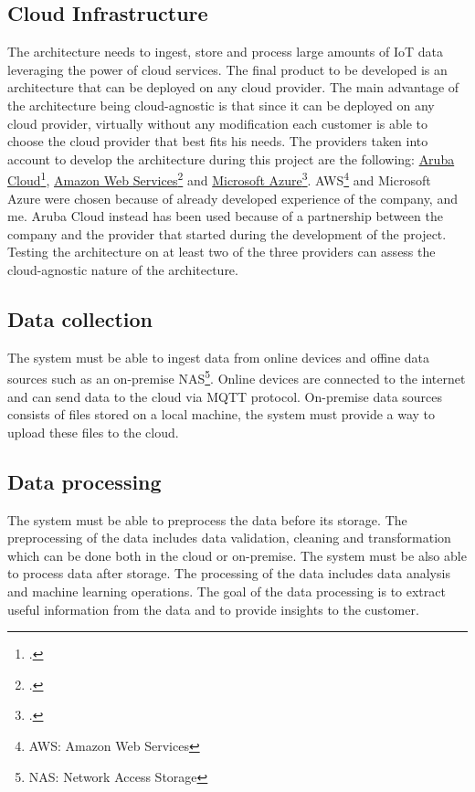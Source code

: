 \subsection{Cloud Infrastructure}
The architecture needs to ingest, store and process large amounts of IoT data leveraging the power of cloud services. The final product to be developed is an architecture that can be deployed on any cloud provider. The main advantage of the architecture being cloud-agnostic is that since it can be deployed on any cloud provider, virtually without any modification each customer is able to choose the cloud provider that best fits his needs.
The providers taken into account to develop the architecture during this project are the following: \href{https://www.arubacloud.com/}{Aruba Cloud}\footcite{site:aruba-cloud}, \href{https://aws.amazon.com/it/}{Amazon Web Services}\footcite{site:aws} and \href{https://azure.microsoft.com/it-it/}{Microsoft Azure}\footcite{site:azure}. 
AWS\footnote{AWS: Amazon Web Services} and Microsoft Azure were chosen because of already developed experience of the company, and me. Aruba Cloud instead has been used because of a partnership between the company and the provider that started during the development of the project. Testing the architecture on at least two of the three providers can assess the cloud-agnostic nature of the architecture.\\


\subsection{Data collection}
The system must be able to ingest data from online devices and offine data sources such as an on-premise NAS\footnote{NAS: Network Access Storage}. 
Online devices are connected to the internet and can send data to the cloud via MQTT protocol.
On-premise data sources consists of files stored on a local machine, the system must provide a way to upload these files to the cloud.
\subsection{Data processing}
The system must be able to preprocess the data before its storage. The preprocessing of the data includes data validation, cleaning and transformation which can be done both in the cloud or on-premise. The system must be also able to process data after storage. The processing of the data includes data analysis and machine learning operations. The goal of the data processing is to extract useful information from the data and to provide insights to the customer.\\ 

